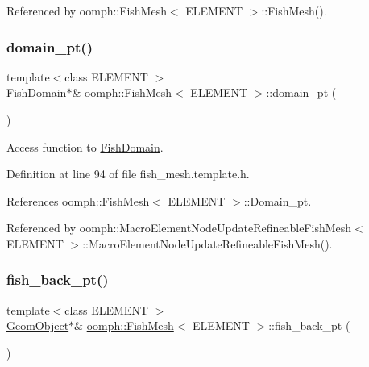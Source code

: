 Referenced by oomph\+::\+Fish\+Mesh$<$ E\+L\+E\+M\+E\+N\+T $>$\+::\+Fish\+Mesh().

\mbox{\label{classoomph_1_1FishMesh_ad5076610d83a07e6306375a2632ee460}} 
\subsubsection{\texorpdfstring{domain\+\_\+pt()}{domain\_pt()}}
{\footnotesize\ttfamily template$<$class E\+L\+E\+M\+E\+NT $>$ \\
\hyperlink{classoomph_1_1FishDomain}{Fish\+Domain}$\ast$\& \hyperlink{classoomph_1_1FishMesh}{oomph\+::\+Fish\+Mesh}$<$ E\+L\+E\+M\+E\+NT $>$\+::domain\+\_\+pt (\begin{DoxyParamCaption}{ }\end{DoxyParamCaption})\hspace{0.3cm}{\ttfamily [inline]}}



Access function to \hyperlink{classoomph_1_1FishDomain}{Fish\+Domain}. 



Definition at line 94 of file fish\+\_\+mesh.\+template.\+h.



References oomph\+::\+Fish\+Mesh$<$ E\+L\+E\+M\+E\+N\+T $>$\+::\+Domain\+\_\+pt.



Referenced by oomph\+::\+Macro\+Element\+Node\+Update\+Refineable\+Fish\+Mesh$<$ E\+L\+E\+M\+E\+N\+T $>$\+::\+Macro\+Element\+Node\+Update\+Refineable\+Fish\+Mesh().

\mbox{\label{classoomph_1_1FishMesh_aa6d659caf657ce5fd549431fadb009d7}} 
\subsubsection{\texorpdfstring{fish\+\_\+back\+\_\+pt()}{fish\_back\_pt()}}
{\footnotesize\ttfamily template$<$class E\+L\+E\+M\+E\+NT $>$ \\
\hyperlink{classoomph_1_1GeomObject}{Geom\+Object}$\ast$\& \hyperlink{classoomph_1_1FishMesh}{oomph\+::\+Fish\+Mesh}$<$ E\+L\+E\+M\+E\+NT $>$\+::fish\+\_\+back\+\_\+pt (\begin{DoxyParamCaption}{ }\end{DoxyParamCaption})\hspace{0.3cm}{\ttfamily [inline]}}



